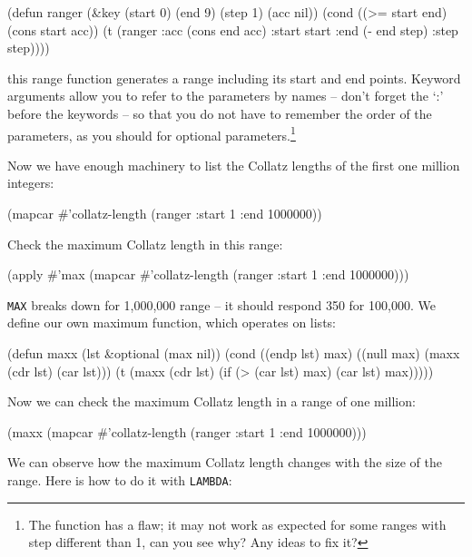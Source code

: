 \documentclass[a4paper,11pt]{article}
\begin{document}
\begin{uenum}
\begin{uenumi}
\begin{lispcode}
(defun ranger (&key (start 0) (end 9) (step 1) (acc nil))
  (cond ((>= start end) (cons start acc))
		(t (ranger :acc (cons end acc)
				   :start start
				   :end (- end step)
				   :step step))))
\end{lispcode}
this range function generates a range including its start and end points. Keyword arguments allow you to refer to the parameters by names -- don't forget the `:' before the keywords -- so that you do not have to remember the order of the parameters, as you should for optional parameters.\footnote{The function has a flaw; it may not work as expected for some ranges with step different than 1, can you see why? Any ideas to fix it?}

\item Now we have enough machinery to list the Collatz lengths of the first one million integers:

\begin{lispcode}
(mapcar #'collatz-length (ranger :start 1 :end 1000000))
\end{lispcode}

\item Check the maximum Collatz length in this range:

\begin{lispcode}
(apply #'max 
	(mapcar #'collatz-length (ranger :start 1 :end 1000000)))
\end{lispcode}

\item \Verb+MAX+ breaks down for 1,000,000 range -- it should respond 350 for 100,000. We define our own maximum function, which operates on lists:

\begin{lispcode}
(defun maxx (lst &optional (max nil))
  (cond ((endp lst) max)
		((null max) (maxx (cdr lst) (car lst)))
		(t (maxx (cdr lst) (if (> (car lst) max)
							 (car lst)
							 max)))))
\end{lispcode}

\item Now we can check the maximum Collatz length in a range of one million:

\begin{lispcode}
(maxx (mapcar #'collatz-length
              (ranger :start 1 :end 1000000))) 
\end{lispcode}

\item We can observe how the maximum Collatz length changes with the size of the range. Here is how to do it with \Verb+LAMBDA+: 


\end{uenumi}
\end{uenum}
\end{document}
